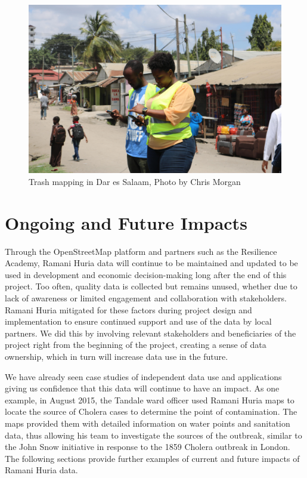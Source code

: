 \documentclass[a4paper,12pt,twoside]{article}
\begin{document}
\begin{figure}[h]
    \centering
    \includegraphics[width=.7\textwidth]{images/Trashmapping_fieldwork_min.JPG}
    \caption{Trash mapping in Dar es Salaam, Photo by Chris Morgan}
\end{figure}

\newpage
\section{Ongoing and Future Impacts}
\begin{multicols}{2}
Through the OpenStreetMap platform and partners such as the Resilience Academy, Ramani Huria data will continue to be maintained and updated to be used in development and economic decision-making long after the end of this project. Too often, quality data is collected but remains unused, whether due to lack of awareness or limited engagement and collaboration with stakeholders. Ramani Huria mitigated for these factors during project design and implementation to ensure continued support and use of the data by local partners. We did this by involving relevant stakeholders and beneficiaries of the project right from the beginning of the project, creating a sense of data ownership, which in turn will increase data use in the future.

We have already seen case studies of independent data use and applications giving us confidence that this data will continue to have an impact. As one example, in August 2015, the Tandale ward officer used Ramani Huria maps to locate the source of Cholera cases to determine the point of contamination. The maps provided them with detailed information on water points and sanitation data, thus allowing his team to investigate the sources of the outbreak, similar to the John Snow initiative in response to the 1859 Cholera outbreak in London. The following sections provide further examples of current and future impacts of Ramani Huria data. 
\end{multicols}
\end{document}
